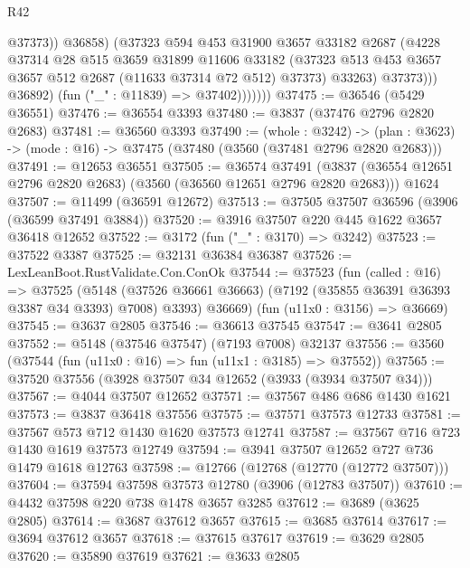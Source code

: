 \begin{lexlean}{R42}
\begin{coremodule}
                            @37373))
                        @36858)
                      (@37323
                        @594
                        @453
                        @31900
                        @3657
                        @33182
                        @2687
                        (@4228
                          @37314
                          @28
                          @515
                          @3659
                          @31899
                          @11606
                          @33182
                          (@37323 @513 @453 @3657 @3657 @512 @2687 (@11633 @37314 @72 @512) @37373)
                          @33263)
                        @37373)))
                  @36892)
                (fun ("_" : @11839) => @37402)))))))
@37475 := @36546 (@5429 @36551)
@37476 := @36554 @3393
@37480 := @3837 (@37476 @2796 @2820 @2683)
@37481 := @36560 @3393
@37490 := (whole : @3242) ->
  (plan : @3623) -> (mode : @16) -> @37475 (@37480 (@3560 (@37481 @2796 @2820 @2683)))
@37491 := @12653 @36551
@37505 := @36574
    @37491
    (@3837 (@36554 @12651 @2796 @2820 @2683) (@3560 (@36560 @12651 @2796 @2820 @2683)))
    @1624
@37507 := @11499 (@36591 @12672)
@37513 := @37505 @37507 @36596 (@3906 (@36599 @37491 @3884))
@37520 := @3916 @37507 @220 @445 @1622 @3657 @36418 @12652
@37522 := @3172 (fun ("_" : @3170) => @3242)
@37523 := @37522 @3387
@37525 := @32131 @36384 @36387
@37526 := LexLeanBoot.RustValidate.Con.ConOk
@37544 := @37523
    (fun (called : @16) =>
    @37525
      (@5148 (@37526 @36661 @36663) (@7192 (@35855 @36391 @36393 @3387 @34 @3393) @7008) @3393)
      @36669)
    (fun (u11x0 : @3156) => @36669)
@37545 := @3637 @2805
@37546 := @36613 @37545
@37547 := @3641 @2805
@37552 := @5148 (@37546 @37547) (@7193 @7008) @32137
@37556 := @3560 (@37544 (fun (u11x0 : @16) => fun (u11x1 : @3185) => @37552))
@37565 := @37520 @37556 (@3928 @37507 @34 @12652 (@3933 (@3934 @37507 @34)))
@37567 := @4044 @37507 @12652
@37571 := @37567 @486 @686 @1430 @1621
@37573 := @3837 @36418 @37556
@37575 := @37571 @37573 @12733
@37581 := @37567 @573 @712 @1430 @1620 @37573 @12741
@37587 := @37567 @716 @723 @1430 @1619 @37573 @12749
@37594 := @3941 @37507 @12652 @727 @736 @1479 @1618 @12763
@37598 := @12766 (@12768 (@12770 (@12772 @37507)))
@37604 := @37594 @37598 @37573 @12780 (@3906 (@12783 @37507))
@37610 := @4432 @37598 @220 @738 @1478 @3657 @3285
@37612 := @3689 (@3625 @2805)
@37614 := @3687 @37612 @3657
@37615 := @3685 @37614
@37617 := @3694 @37612 @3657
@37618 := @37615 @37617
@37619 := @3629 @2805
@37620 := @35890 @37619
@37621 := @3633 @2805

\end{coremodule}
\end{lexlean}
